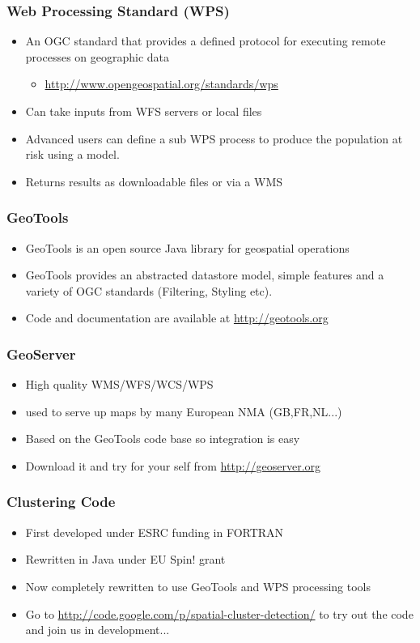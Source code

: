 \documentclass{beamer}
\begin{document}
\begin{frame}[t]
\frametitle{Web Processing Standard (WPS)}
\begin{itemize}
  \item An OGC standard that provides a defined protocol for executing remote processes on geographic data
  \begin{itemize}
    \item \href{http://www.opengeospatial.org/standards/wps}{http://www.opengeospatial.org/standards/wps}
  \end{itemize}
  \item Can take inputs from WFS servers or local files
  \item Advanced users can define a sub WPS process to produce the population at risk using a model.
  \item Returns results as downloadable files or via a WMS
\end{itemize}
\end{frame}

\begin{frame}[t]
\frametitle{GeoTools}
\begin{itemize}
  \item GeoTools is an open source Java library for geospatial operations \citep{Hall2008}
  \item GeoTools provides an abstracted datastore model, simple features and a variety of OGC standards (Filtering, Styling etc).
  \item Code and documentation are available at \url{http://geotools.org}
\end{itemize}
\end{frame}

\begin{frame}[t]
\frametitle{GeoServer}
\begin{itemize}
  \item High quality WMS/WFS/WCS/WPS
  \item used to serve up maps by many European NMA (GB,FR,NL...)
  \item Based on the GeoTools code base so integration is easy
  \item Download it and try for your self from \url{http://geoserver.org}
\end{itemize}
\end{frame}

\begin{frame}[t]
\frametitle{Clustering Code}
\begin{itemize}
  \item First developed under ESRC funding in FORTRAN
  \item Rewritten in Java under EU Spin! grant
  \item Now completely rewritten to use GeoTools and WPS processing tools
  \item Go to \url{http://code.google.com/p/spatial-cluster-detection/} to try out the code and join us in development... 
\end{itemize}
\end{frame}
\end{document}
